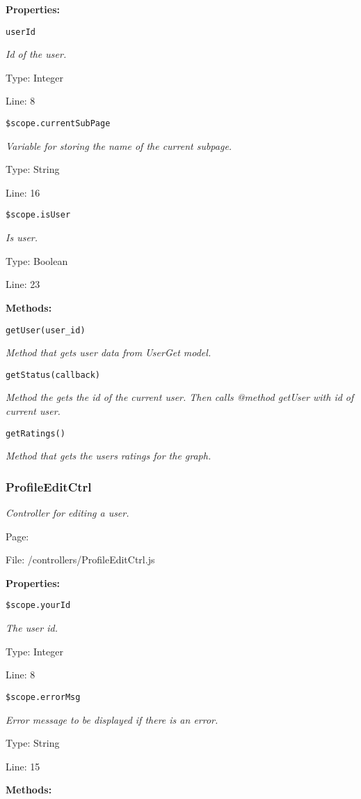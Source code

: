 \textbf{Properties:}

\texttt{userId}

{\scriptsize
\textit{Id of the user.}

Type: Integer

Line: 8

}
\texttt{\$scope.currentSubPage}

{\scriptsize
\textit{Variable for storing the name of the current subpage.}

Type: String

Line: 16

}
\texttt{\$scope.isUser}

{\scriptsize
\textit{Is user.}

Type: Boolean

Line: 23

}
\textbf{Methods:}

\texttt{getUser(user\_id)}

{\scriptsize
\textit{Method that gets user data from UserGet model.}

}

\texttt{getStatus(callback)}

{\scriptsize
\textit{Method the gets the id of the current user.
Then calls @method getUser with id of current user.}

}

\texttt{getRatings()}

{\scriptsize
\textit{Method that gets the users ratings for the graph.}

}

\subsubsection{ProfileEditCtrl}\label{ProfileEditCtrl.js.doc}
\textit{Controller for editing a user.}

Page: \pageref{ProfileEditCtrl.js}

File: /controllers/ProfileEditCtrl.js

\textbf{Properties:}

\texttt{\$scope.yourId}

{\scriptsize
\textit{The user id.}

Type: Integer

Line: 8

}
\texttt{\$scope.errorMsg}

{\scriptsize
\textit{Error message to be displayed if there is an error.}

Type: String

Line: 15

}
\textbf{Methods:}

